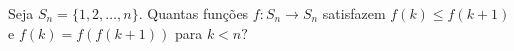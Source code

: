 Seja \(S_{n}=\{1,2,\dots,n\}\). Quantas funções \(f\colon S_{n} \to S_{n}\) satisfazem \(f(k) \leq f(k+1)\) e \(f(k)=f(f(k+1))\) para \(k <n?\)
